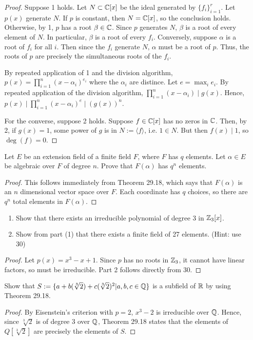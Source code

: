 \documentclass{article}
\begin{document}
\begin{proof}
Suppose 1 holds. Let $N \subset \mathbb{C}[x]$ be the ideal generated by $\{f_i\}_{i=1}^r$. Let $p(x)$ generate $N$. If $p$ is constant, then $N = \mathbb{C}[x]$, so the conclusion holds. Otherwise, by 1, $p$ has a root $\beta \in \mathbb{C}$. Since $p$ generates $N$, $\beta$ is a root of every element of $N$. In particular, $\beta$ is a root of every $f_i$. Conversely, suppose $\alpha$ is a root of $f_i$ for all $i$. Then since the $f_i$ generate $N$, $\alpha$ must be a root of $p$. Thus, the roots of $p$ are precisely the simultaneous roots of the $f_i$.

By repeated application of 1 and the division algorithm, $p(x) = \prod_{i=1}^n(x-\alpha_i)^{e_i}$ where the $\alpha_i$ are distince. Let $e = \max_i e_i$. By repeated application of the division algorithm, $\prod_{i=1}^n (x - \alpha_i) \mid g(x)$. Hence, $p(x) \mid \prod_{i=1}^n (x - \alpha_i)^e \mid (g(x))^n$.

For the converse, suppose 2 holds. Suppose $f \in \mathbb{C}[x]$ has no zeros in $\mathbb{C}$. Then, by 2, if $g(x) = 1$, some power of $g$ is in $N := \langle f \rangle$, i.e. $1 \in N$. But then $f(x) \mid 1$, so $\deg(f) = 0$.
\end{proof}
 Let $E$ be an extension field of a finite field $F$, where $F$ has $q$ elements. Let $\alpha \in E$ be algebraic over $F$ of degree $n$. Prove that $F(\alpha)$ has $q^n$ elements.
\begin{proof}
This follows immediately from Theorem 29.18, which says that $F(\alpha)$ is an $n$ dimensional vector space over $F$. Each coordinate has $q$ choices, so there are $q^n$ total elements in $F(\alpha)$.
\end{proof}
\begin{enumerate}
\item Show that there exists an irreducible polynomial of degree $3$ in $\mathbb{Z}_3[x]$.
\item Show from part (1) that there exists a finite field of 27 elements. (Hint: use 30)
\end{enumerate}
\begin{proof}
Let $p(x) = x^3 - x + 1$. Since $p$ has no roots in $\mathbb{Z}_3$, it cannot have linear factors, so must be irreducible. Part 2 follows directly from 30.
\end{proof}
 Show that $S := \{a + b(\sqrt[3] 2) + c(\sqrt[3] 2)^2 | a,b,c \in \mathbb{Q}\}$ is a subfield of $\mathbb{R}$ by using Theorem 29.18.
\begin{proof}
By Eisenstein's criterion with $p=2$, $x^3 - 2$ is irreducible over $\mathbb{Q}$. Hence, since $\sqrt[3] 2$ is of degree 3 over $\mathbb{Q}$, Theorem 29.18 states that the elements of $Q[\sqrt[3] 2]$ are precisely the elements of $S$.
\end{proof}
\end{document}
